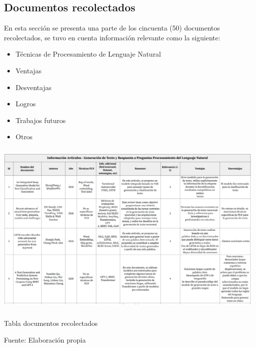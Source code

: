 \documentclass[../Main.tex]{subfiles}
\begin{document}
\subsection{Documentos recolectados}
\begin{justify}
En esta sección se presenta una parte de los cincuenta (50) documentos recolectados, se tuvo en cuenta información relevante como la siguiente:

\begin{itemize}
	\item Técnicas de Procesamiento de Lenguaje Natural\par

	\item Ventajas\par

	\item Desventajas \par

    \item Logros \par
    
    \item Trabajos futuros \par
    
    \item Otros \par
\end{itemize}\par
\end{justify}

\par

\begin{table}[H]
\begin{Center}
	\includegraphics[width=6.4in,height=3.4in]{Images/InicioTablaPapers.png}
\caption{Tabla documentos recolectados}
Fuente: Elaboración propia
\label{tab:table1}
\end{Center}
 \end{table}
\end{document}
